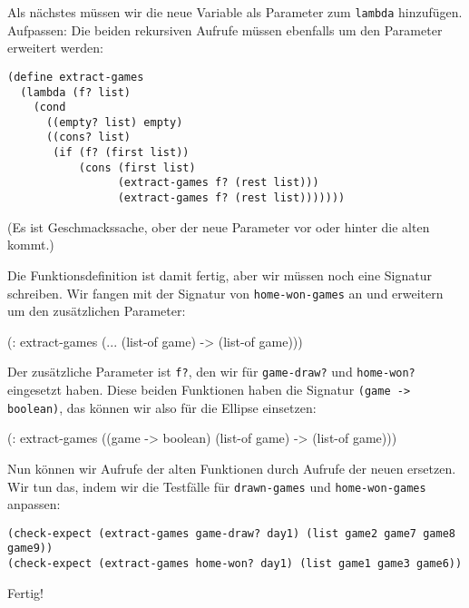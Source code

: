 %
Als nächstes müssen wir die neue Variable als Parameter zum
\lstinline{lambda} hinzufügen.  Aufpassen: Die beiden rekursiven
Aufrufe müssen ebenfalls um den Parameter erweitert werden:
%
\begin{lstlisting}
(define extract-games
  (lambda (f? list)
    (cond
      ((empty? list) empty)
      ((cons? list)
       (if (f? (first list))
           (cons (first list)
                 (extract-games f? (rest list)))
                 (extract-games f? (rest list)))))))
\end{lstlisting}
%
(Es ist Geschmackssache, ober der neue Parameter vor oder hinter die
alten kommt.)

Die Funktionsdefinition ist damit fertig, aber wir müssen noch eine
Signatur schreiben.  Wir fangen mit der Signatur von
\lstinline{home-won-games} an und erweitern um den zusätzlichen
Parameter:
%
\begin{lstinline}
(: extract-games (... (list-of game) -> (list-of game)))
\end{lstinline}
%
Der zusätzliche Parameter ist \lstinline{f?}, den wir für
\lstinline{game-draw?} und \lstinline{home-won?} eingesetzt haben.
Diese beiden Funktionen haben die Signatur
\lstinline{(game -> boolean)}, das können wir also für die Ellipse
einsetzen:
%
\begin{lstinline}
(: extract-games ((game -> boolean) (list-of game) -> (list-of game)))
\end{lstinline}
%
Nun können wir Aufrufe der alten Funktionen durch Aufrufe der neuen
ersetzen.  Wir tun das, indem wir die Testfälle für
\lstinline{drawn-games} und \lstinline{home-won-games} anpassen:
%
\begin{lstlisting}
(check-expect (extract-games game-draw? day1) (list game2 game7 game8 game9))
(check-expect (extract-games home-won? day1) (list game1 game3 game6))
\end{lstlisting}
%
Fertig!

